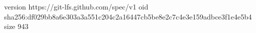 version https://git-lfs.github.com/spec/v1
oid sha256:df029bb8a6e303a3a551c204c2a16447cb5be8e2c7c4e3e159adbce3f1e4e5b4
size 943
